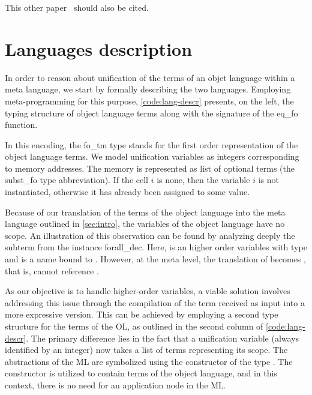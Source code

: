 \documentclass[sigconf,natbib=false]{acmart}
\begin{document}
This other paper~\cite{10.1007/978-3-031-38499-8_25} should also be cited.

\section{Languages description}
\label{sec:lang-spec}




\def\eqfo{eq\_fo\xspace}

In order to reason about unification of the terms of an objet language within a
meta language, we start by formally describing the two languages. Employing
meta-programming for this purpose, \cref{code:lang-descr} presents, on the left,
the typing structure of object language terms along with the signature of the
\eqfo function.

In this encoding, the fo\_tm type stands for the first order representation of
the object language terms. We model unification variables as integers
corresponding to memory addresses. The memory is represented as list of optional
terms (the subst\_fo type abbreviation). If the cell $i$ is none, then the
variable $i$ is not instantiated, otherwise it has already been assigned to some
value. 

Because of our translation of the terms of the object language into the meta
language outlined in \cref{sec:intro}, the variables of the object language have 
no scope.
An illustration of this observation can be found by analyzing deeply the subterm  from
the instance forall\_dec. Here,  is an higher order variables
with type  and
 is a name bound to .
However, at the meta level, the translation of  becomes , that is,  cannot reference .

As our objective is to handle higher-order variables, a viable solution involves
addressing this issue through the compilation of the term received as input into
a more expressive version. This can be achieved by employing a second type
structure for the terms of the OL, as outlined in the second column of
\cref{code:lang-descr}. The primary difference lies in the fact that a
unification variable (always identified by an integer) now takes a list of terms
representing its scope. The abstractions of the ML are
symbolized using the constructor  of the type . The
constructor  is utilized to contain terms of the object language,
and in this context, there is no need for an application node in the ML.
\end{document}
